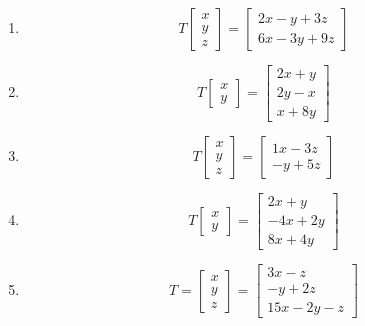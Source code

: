 \begin{problema}
\begin{enumerate}
\item$$
T\begin{bmatrix}
  x \\ y \\z
 \end{bmatrix}
 =\begin{bmatrix}
   2x-y+3z \\ 6x -3y +9z
  \end{bmatrix}
$$

\item $$
T\begin{bmatrix}
  x \\ y 
 \end{bmatrix}
 =\begin{bmatrix}
2x+y \\ 2y-x \\ x+8y
  \end{bmatrix}
$$
\item
$$
T\begin{bmatrix}
  x\\y\\z
 \end{bmatrix}
=\begin{bmatrix}
  1x  -3z \\
   -y + 5z
 \end{bmatrix}
$$
\item
$$
T\begin{bmatrix}
  x \\ y
 \end{bmatrix}
=\begin{bmatrix}
  2x+y\\
  -4x + 2y \\
  8x + 4y
 \end{bmatrix}
$$
\item
$$
T=\begin{bmatrix}
   x\\y\\z
  \end{bmatrix}
=\begin{bmatrix}
  3x  -z \\
  -y + 2z \\
  15x  -2y  -z
 \end{bmatrix}
$$


% 
\end{enumerate}
\end{problema}

